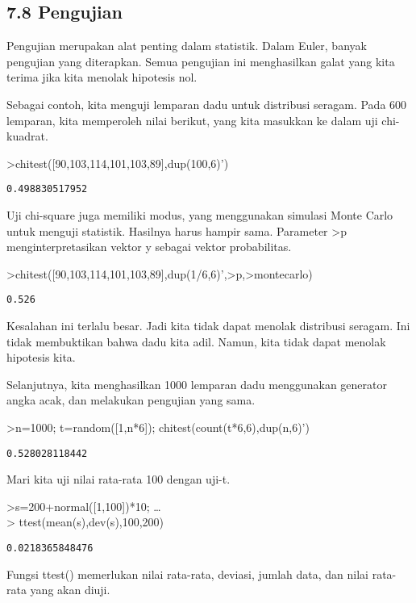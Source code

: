 \documentclass[
]{book}
\begin{document}
\subsection{7.8 Pengujian}\label{pengujian}

Pengujian merupakan alat penting dalam statistik. Dalam Euler, banyak pengujian yang diterapkan. Semua pengujian ini menghasilkan galat yang kita terima jika kita menolak hipotesis nol.

Sebagai contoh, kita menguji lemparan dadu untuk distribusi seragam. Pada 600 lemparan, kita memperoleh nilai berikut, yang kita masukkan ke dalam uji chi-kuadrat.

\textgreater chitest({[}90,103,114,101,103,89{]},dup(100,6)')

\begin{verbatim}
0.498830517952
\end{verbatim}

Uji chi-square juga memiliki modus, yang menggunakan simulasi Monte Carlo untuk menguji statistik. Hasilnya harus hampir sama. Parameter \textgreater p menginterpretasikan vektor y sebagai vektor probabilitas.

\textgreater chitest({[}90,103,114,101,103,89{]},dup(1/6,6)',\textgreater p,\textgreater montecarlo)

\begin{verbatim}
0.526
\end{verbatim}

Kesalahan ini terlalu besar. Jadi kita tidak dapat menolak distribusi seragam. Ini tidak membuktikan bahwa dadu kita adil. Namun, kita tidak dapat menolak hipotesis kita.

Selanjutnya, kita menghasilkan 1000 lemparan dadu menggunakan generator angka acak, dan melakukan pengujian yang sama.

\textgreater n=1000; t=random({[}1,n*6{]}); chitest(count(t*6,6),dup(n,6)')

\begin{verbatim}
0.528028118442
\end{verbatim}

Mari kita uji nilai rata-rata 100 dengan uji-t.

\textgreater s=200+normal({[}1,100{]})*10; \ldots{}\\
\textgreater{} ttest(mean(s),dev(s),100,200)

\begin{verbatim}
0.0218365848476
\end{verbatim}

Fungsi ttest() memerlukan nilai rata-rata, deviasi, jumlah data, dan nilai rata-rata yang akan diuji.
\end{document}
